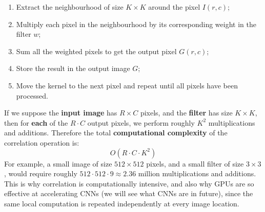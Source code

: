 \begin{enumerate}
    \item Extract the neighbourhood of size $K \times K$ around the pixel $I\left(r,c\right)$;
    \item Multiply each pixel in the neighbourhood by its corresponding weight in the filter $w$;
    \item Sum all the weighted pixels to get the output pixel $G\left(r,c\right)$;
    \item Store the result in the output image $G$;
    \item Move the kernel to the next pixel and repeat until all pixels have been processed.
\end{enumerate}
If we suppose the \textbf{input image} has $R \times C$ pixels, and the \textbf{filter} has size $K \times K$, then for \textbf{each} of the $R \cdot C$ output pixels, we perform roughly $K^{2}$ multiplications and additions. Therefore the total \textbf{computational complexity} of the correlation operation is:
\begin{equation}\label{eq:correlation-complexity}
    O\left(R \cdot C \cdot K^{2}\right)
\end{equation}
For example, a small image of size $512 \times 512$ pixels, and a small filter of size $3 \times 3$, would require roughly $512 \cdot 512 \cdot 9 \approx 2.36$ million multiplications and additions. This is why correlation is computationally intensive, and also why GPUs are so effective at accelerating CNNs (we will see what CNNs are in future), since the same local computation is repeated independently at every image location.